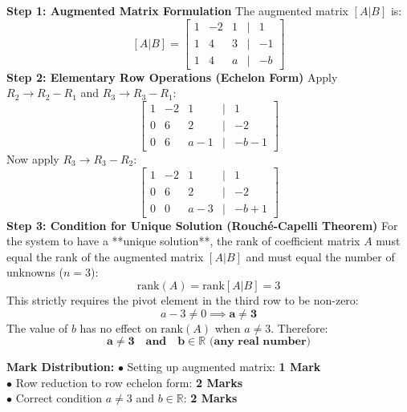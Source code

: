 \begin{solutionbox}
\textbf{Step 1: Augmented Matrix Formulation}
The augmented matrix $[A|B]$ is:
\[
[A|B] = \begin{bmatrix} 1 & -2 & 1 & | & 1 \\ 1 & 4 & 3 & | & -1 \\ 1 & 4 & a & | & -b \end{bmatrix}
\]
\textbf{Step 2: Elementary Row Operations (Echelon Form)}
Apply $R_2 \to R_2 - R_1$ and $R_3 \to R_3 - R_1$:
\[
\begin{bmatrix}
1 & -2 & 1 & | & 1 \\
0 & 6 & 2 & | & -2 \\
0 & 6 & a-1 & | & -b-1
\end{bmatrix}
\]
Now apply $R_3 \to R_3 - R_2$:
\[
\begin{bmatrix}
1 & -2 & 1 & | & 1 \\
0 & 6 & 2 & | & -2 \\
0 & 0 & a-3 & | & -b+1
\end{bmatrix}
\]
\textbf{Step 3: Condition for Unique Solution (Rouché-Capelli Theorem)}
For the system to have a **unique solution**, the rank of coefficient matrix $A$ must equal the rank of the augmented matrix $[A|B]$ and must equal the number of unknowns ($n=3$):
\[
\text{rank}(A) = \text{rank}[A|B] = 3
\]
This strictly requires the pivot element in the third row to be non-zero:
\[
a - 3 \neq 0 \implies \mathbf{a \neq 3}
\]
The value of $b$ has no effect on $\text{rank}(A)$ when $a \neq 3$. Therefore:
\[
\mathbf{a \neq 3 \quad \text{and} \quad b \in \mathbb{R} \text{ (any real number)}}
\]

\begin{markingrubric}
\textbf{Mark Distribution:}
$\bullet$ Setting up augmented matrix: \textbf{1 Mark}\\
$\bullet$ Row reduction to row echelon form: \textbf{2 Marks}\\
$\bullet$ Correct condition $a \neq 3$ and $b \in \mathbb{R}$: \textbf{2 Marks}
\end{markingrubric}
\end{solutionbox}

